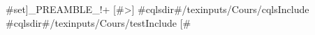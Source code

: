 {#set]_PREAMBLE_!+
[#>]
 {#cqlsdir#}/texinputs/Cours/cqlsInclude
 {#cqlsdir#}/texinputs/Cours/testInclude
[#}